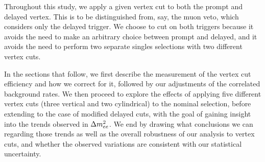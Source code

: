 \documentclass[../thesis.tex]{subfiles}
\begin{document}
Throughout this study, we apply a given vertex cut to both the prompt and delayed vertex. This is to be distinguished from, say, the muon veto, which considers only the delayed trigger. We choose to cut on both triggers because it avoids the need to make an arbitrary choice between prompt and delayed, and it avoids the need to perform two separate singles selections with two different vertex cuts.

In the sections that follow, we first describe the measurement of the vertex cut efficiency and how we correct for it, followed by our adjustments of the correlated background rates. We then proceed to explore the effects of applying five different vertex cuts (three vertical and two cylindrical) to the nominal selection, before extending to the case of modified delayed cuts, with the goal of gaining insight into the trends observed in $\Delta m^2_{ee}$. We end by drawing what conclusions we can regarding those trends as well as the overall robustness of our analysis to vertex cuts, and whether the observed variations are consistent with our statistical uncertainty.
\end{document}
